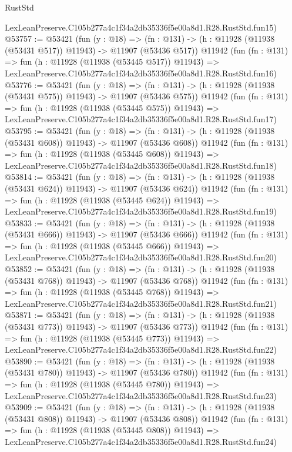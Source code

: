 \begin{lexlean}{RustStd}
\begin{coremodule}
    LexLeanPreserve.C105b277a4c1f34a2db35336f5e00a8d1.R28.RustStd.fun15)
@53757 := @53421
    (fun (y : @18) =>
    (fn : @131) -> (h : @11928 (@11938 (@53431 @517)) @11943) -> @11907 (@53436 @517))
    @11942
    (fun (fn : @131) =>
    fun (h : @11928 (@11938 (@53445 @517)) @11943) =>
    LexLeanPreserve.C105b277a4c1f34a2db35336f5e00a8d1.R28.RustStd.fun16)
@53776 := @53421
    (fun (y : @18) =>
    (fn : @131) -> (h : @11928 (@11938 (@53431 @575)) @11943) -> @11907 (@53436 @575))
    @11942
    (fun (fn : @131) =>
    fun (h : @11928 (@11938 (@53445 @575)) @11943) =>
    LexLeanPreserve.C105b277a4c1f34a2db35336f5e00a8d1.R28.RustStd.fun17)
@53795 := @53421
    (fun (y : @18) =>
    (fn : @131) -> (h : @11928 (@11938 (@53431 @608)) @11943) -> @11907 (@53436 @608))
    @11942
    (fun (fn : @131) =>
    fun (h : @11928 (@11938 (@53445 @608)) @11943) =>
    LexLeanPreserve.C105b277a4c1f34a2db35336f5e00a8d1.R28.RustStd.fun18)
@53814 := @53421
    (fun (y : @18) =>
    (fn : @131) -> (h : @11928 (@11938 (@53431 @624)) @11943) -> @11907 (@53436 @624))
    @11942
    (fun (fn : @131) =>
    fun (h : @11928 (@11938 (@53445 @624)) @11943) =>
    LexLeanPreserve.C105b277a4c1f34a2db35336f5e00a8d1.R28.RustStd.fun19)
@53833 := @53421
    (fun (y : @18) =>
    (fn : @131) -> (h : @11928 (@11938 (@53431 @666)) @11943) -> @11907 (@53436 @666))
    @11942
    (fun (fn : @131) =>
    fun (h : @11928 (@11938 (@53445 @666)) @11943) =>
    LexLeanPreserve.C105b277a4c1f34a2db35336f5e00a8d1.R28.RustStd.fun20)
@53852 := @53421
    (fun (y : @18) =>
    (fn : @131) -> (h : @11928 (@11938 (@53431 @768)) @11943) -> @11907 (@53436 @768))
    @11942
    (fun (fn : @131) =>
    fun (h : @11928 (@11938 (@53445 @768)) @11943) =>
    LexLeanPreserve.C105b277a4c1f34a2db35336f5e00a8d1.R28.RustStd.fun21)
@53871 := @53421
    (fun (y : @18) =>
    (fn : @131) -> (h : @11928 (@11938 (@53431 @773)) @11943) -> @11907 (@53436 @773))
    @11942
    (fun (fn : @131) =>
    fun (h : @11928 (@11938 (@53445 @773)) @11943) =>
    LexLeanPreserve.C105b277a4c1f34a2db35336f5e00a8d1.R28.RustStd.fun22)
@53890 := @53421
    (fun (y : @18) =>
    (fn : @131) -> (h : @11928 (@11938 (@53431 @780)) @11943) -> @11907 (@53436 @780))
    @11942
    (fun (fn : @131) =>
    fun (h : @11928 (@11938 (@53445 @780)) @11943) =>
    LexLeanPreserve.C105b277a4c1f34a2db35336f5e00a8d1.R28.RustStd.fun23)
@53909 := @53421
    (fun (y : @18) =>
    (fn : @131) -> (h : @11928 (@11938 (@53431 @808)) @11943) -> @11907 (@53436 @808))
    @11942
    (fun (fn : @131) =>
    fun (h : @11928 (@11938 (@53445 @808)) @11943) =>
    LexLeanPreserve.C105b277a4c1f34a2db35336f5e00a8d1.R28.RustStd.fun24)

\end{coremodule}
\end{lexlean}
